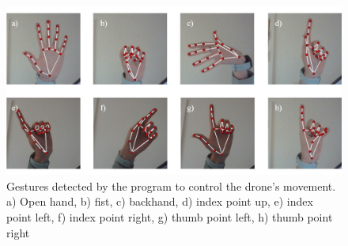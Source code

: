 \begin{figure}[H]
  \centering
  \includegraphics[width=\textwidth, keepaspectratio]{img/hand-gestures.jpg}
  \caption{Gestures detected by the program to control the drone's movement. a) Open hand, b) fist, c) backhand, d) index point up, e) index point left, f) index point right, g) thumb point left, h) thumb point right}
  \label{fig:hand-gestures}
\end{figure}


